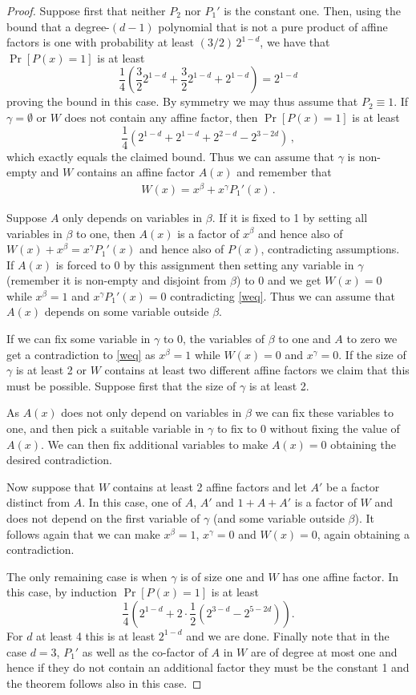 \begin{proof}
Suppose first that neither $P_2$ nor $P_1'$ is
the constant one.
Then, using the bound that a 
%
degree-$(d-1)$
polynomial that
is not a pure product of affine factors is one with
probability at least $(3/2)\,2^{1-d}$, we have
that $\Pr[P(x)=1]$ is at least
$$
\frac 14 \left(\frac 32 2^{1-d}+\frac 32 2^{1-d}+2^{1-d}\right)= 2^{1-d}
$$
proving the bound in this case.
By symmetry we may thus assume 
that $P_2\equiv 1$.
If $\gamma=\emptyset$
or $W$ does not contain any affine factor,
then $\Pr[P(x)=1]$ is at least
$$
\frac 14 (2^{1-d}+2^{1-d}+2^{2-d}-2^{3-2d})\,,
$$
which exactly equals the claimed bound.
Thus we can assume that $\gamma$ is non-empty
and $W$ contains an affine factor $A(x)$ and remember
that \begin{eqnarray}\label{weq}
W(x)=x^\beta + x^\gamma P_1'(x)\,.
\end{eqnarray}

Suppose $A$ only depends
on variables in $\beta$.  If it is fixed to
1 by setting all variables in $\beta$
to one, then $A(x)$ is a factor of $x^\beta$
and hence also of $W(x)+x^\beta=x^\gamma P_1'(x)$
and hence also of $P(x)$, contradicting assumptions.
If $A(x)$ is forced to 0 by this assignment
then setting any variable
in $\gamma$ (remember it is non-empty and disjoint
from $\beta$) to 0 and we get $W(x)=0$ while
$x^\beta=1$ and $x^\gamma P_1'(x)=0$ contradicting
\eqref{weq}.  Thus we can assume
that $A(x)$ depends on some variable
outside $\beta$.

If we can fix some variable in $\gamma$ to 0,
the variables of $\beta$ to one and $A$ to zero
we get a contradiction to \eqref{weq} as
$x^\beta=1$ while $W(x)=0$ and $x^\gamma=0$.
If the size of $\gamma$ is
at least 2 or $W$ contains at least two different
affine factors we claim that this must be possible.  Suppose first
that the size of $\gamma$ is at least 2.

As $A(x)$ does not only depend on variables
in $\beta$ we can fix these variables to
one, and then pick a suitable variable
in $\gamma$ to fix to 0 without fixing
the value of $A(x)$. We can then fix
additional variables to make $A(x)=0$
obtaining the desired contradiction.

Now suppose that $W$ contains at least
2 affine factors and let $A'$ be a factor distinct
from $A$.  In this case,
one of $A$, $A'$ and $1+A+A'$ is
a factor of $W$ and does not
depend on the first variable of $\gamma$
(and some variable outside $\beta$).
It follows again that we can
make $x^\beta=1$, $x^\gamma=0$ and $W(x)=0$,
again obtaining a contradiction.

The only remaining case is when $\gamma$ is
of size one and $W$ has one affine factor.
In this case, by induction
$\Pr[P(x)=1]$ is at least
$$
\frac 14 \left(2^{1-d}+ 2\cdot \frac 12 \left(2^{3-d}-2^{5-2d}\right)\right).
$$
For $d$ at least 4 this is at least $2^{1-d}$
and we are done.  Finally note that in the
case $d=3$, $P_1'$ as well as the co-factor
of $A$ in $W$ are of degree at most one
and hence if they do not contain an
additional factor they must be the constant
1 and the theorem follows also in this case.
\end{proof}

